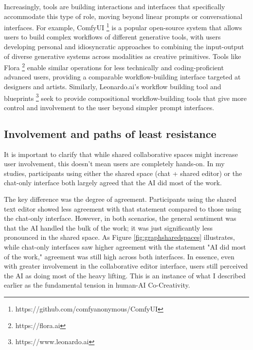 Increasingly, tools are building interactions and interfaces that specifically accommodate this type of role, moving beyond linear prompts or conversational interfaces. For example, ComfyUI \footnote{https://github.com/comfyanonymous/ComfyUI} is a popular open-source system that allows users to build complex workflows of different generative tools, with users developing personal and idiosyncratic approaches to combining the input-output of diverse generative systems across modalities as creative primitives. Tools like Flora \footnote{https://flora.ai} enable similar operations for less technically and coding-proficient advanced users, providing a comparable workflow-building interface targeted at designers and artists. Similarly, Leonardo.ai's workflow building tool and blueprints \footnote{https://www.leonardo.ai} seek to provide compositional workflow-building tools that give more control and involvement to the user beyond simpler prompt interfaces.

\subsection{Involvement and paths of least resistance}

It is important to clarify that while shared collaborative spaces might increase user involvement, this doesn't mean users are completely hands-on. In my studies, participants using either the shared space (chat + shared editor) or the chat-only interface both largely agreed that the AI did most of the work.

The key difference was the degree of agreement. Participants using the shared text editor showed less agreement with that statement compared to those using the chat-only interface. However, in both scenarios, the general sentiment was that the AI handled the bulk of the work; it was just significantly less pronounced in the shared space. As Figure \ref{fig:graphsharedspaces} illustrates, while chat-only interfaces saw higher agreement with the statement "AI did most of the work," agreement was still high across both interfaces. In essence, even with greater involvement in the collaborative editor interface, users still perceived the AI as doing most of the heavy lifting. This is an instance of what I described earlier as the fundamental tension in human-AI Co-Creativity.

